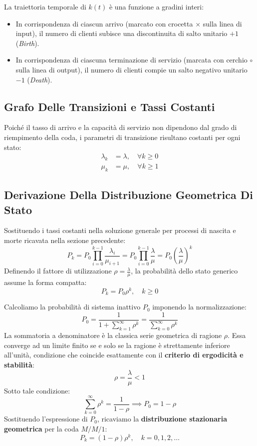 \documentclass[11pt, a4paper]{article}
\begin{document}
La traiettoria temporale di $k(t)$ è una funzione a gradini interi:
\begin{itemize}
    \item In corrispondenza di ciascun arrivo (marcato con crocetta $\times$ sulla linea di input), il numero di clienti subisce una discontinuita di salto unitario $+1$ (\emph{Birth}).
    \item In corrispondenza di ciascuna terminazione di servizio (marcata con cerchio $\circ$ sulla linea di output), il numero di clienti compie un salto negativo unitario $-1$ (\emph{Death}).
\end{itemize}

\subsection{Grafo Delle Transizioni e Tassi Costanti}

Poiché il tasso di arrivo e la capacità di servizio non dipendono dal grado di riempimento della coda, i parametri di transizione risultano costanti per ogni stato:
\begin{align*}
    \lambda_k &= \lambda, \quad \forall k \ge 0 \\
    \mu_k &= \mu, \quad \forall k \ge 1
\end{align*}


\subsection{Derivazione Della Distribuzione Geometrica Di Stato}

Sostituendo i tassi costanti nella soluzione generale per processi di nascita e morte ricavata nella sezione precedente:
\[
    P_k = P_0 \prod_{i=0}^{k-1} \frac{\lambda_i}{\mu_{i+1}} = P_0 \prod_{i=0}^{k-1} \frac{\lambda}{\mu} = P_0 \left( \frac{\lambda}{\mu} \right)^k
\]
Definendo il fattore di utilizzazione $\rho = \frac{\lambda}{\mu}$, la probabilità dello stato generico assume la forma compatta:
\[
    \boxed{P_k = P_0 \rho^k, \quad k \ge 0}
\]

Calcoliamo la probabilità di sistema inattivo $P_0$ imponendo la normalizzazione:
\[
    P_0 = \frac{1}{1 + \displaystyle\sum_{k=1}^{\infty} \rho^k} = \frac{1}{\displaystyle\sum_{k=0}^{\infty} \rho^k}
\]
La sommatoria a denominatore è la classica serie geometrica di ragione $\rho$. Essa converge ad un limite finito se e solo se la ragione è strettamente inferiore all'unità, condizione che coincide esattamente con il \textbf{criterio di ergodicità e stabilità}:
\[
    \boxed{\rho = \frac{\lambda}{\mu} < 1}
\]
Sotto tale condizione:
\[
    \sum_{k=0}^{\infty} \rho^k = \frac{1}{1 - \rho} \implies \boxed{P_0 = 1 - \rho}
\]
Sostituendo l'espressione di $P_0$, ricaviamo la \textbf{distribuzione stazionaria geometrica} per la coda $M/M/1$:
\[
    \boxed{P_k = (1 - \rho)\rho^k, \quad k = 0, 1, 2, \dots}
\]
\end{document}
